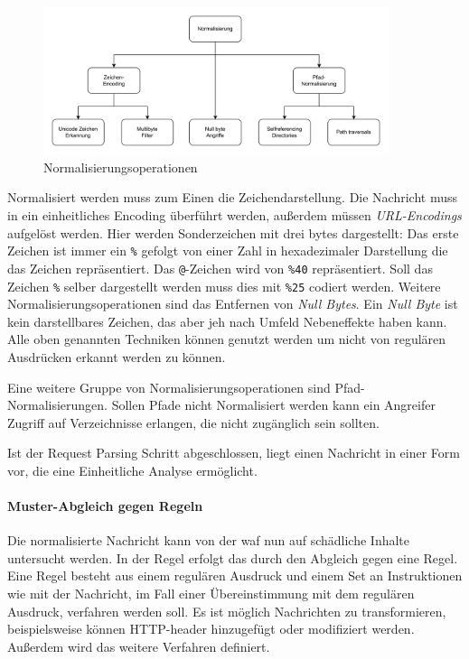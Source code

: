 \begin{figure}[!hbt]
    \centering
    \includegraphics[width=0.9\textwidth]{./images/Normalisierung.png}
    \caption{Normalisierungsoperationen}
    \label{fig:norming}
\end{figure}

Normalisiert werden muss zum Einen die Zeichendarstellung.
Die Nachricht muss in ein einheitliches Encoding überführt werden, außerdem müssen \textit{URL-Encodings} aufgelöst werden.
Hier werden Sonderzeichen mit drei bytes dargestellt:
Das erste Zeichen ist immer ein \verb|%| gefolgt von einer Zahl in hexadezimaler Darstellung die das Zeichen repräsentiert.
Das \verb|@|-Zeichen wird von \verb|%40| repräsentiert.
Soll das Zeichen \verb|%| selber dargestellt werden muss dies mit \verb|%25| codiert werden.
Weitere Normalisierungsoperationen sind das Entfernen von \textit{Null Bytes}.
Ein \textit{Null Byte} ist kein darstellbares Zeichen, das aber jeh nach Umfeld Nebeneffekte haben kann.
Alle oben genannten Techniken können genutzt werden um nicht von regulären Ausdrücken erkannt werden zu können.

Eine weitere Gruppe von Normalisierungsoperationen sind Pfad-Normalisierungen.
Sollen Pfade nicht Normalisiert werden kann ein Angreifer Zugriff auf Verzeichnisse erlangen, die nicht zugänglich sein sollten.

Ist der Request Parsing Schritt abgeschlossen, liegt einen Nachricht in einer Form vor, die eine Einheitliche Analyse ermöglicht.

\paragraph{Muster-Abgleich gegen Regeln}
Die normalisierte Nachricht kann von der \ac{waf} nun auf schädliche Inhalte untersucht werden.
In der Regel erfolgt das durch den Abgleich gegen eine Regel.
Eine Regel besteht aus einem regulären Ausdruck und einem Set an Instruktionen wie mit der Nachricht, im Fall einer Übereinstimmung mit dem regulären Ausdruck, verfahren werden soll.
Es ist möglich Nachrichten zu transformieren, beispielsweise können HTTP-header hinzugefügt oder modifiziert werden.
Außerdem wird das weitere Verfahren definiert.

